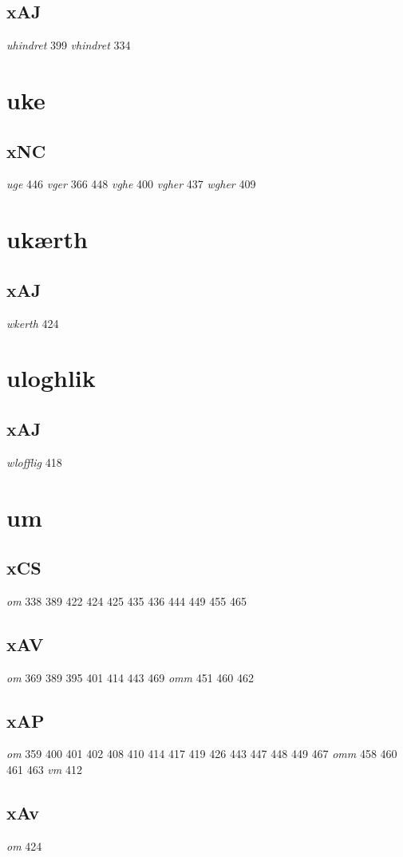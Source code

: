\documentclass[a4paper,twocolumn]{article}
\begin{document}
\subsection{xAJ}
\label{sec:org66fe8f0}
\emph{uhindret} 399 \emph{vhindret} 334 
\section{uke}
\label{sec:org7953daa}
\subsection{xNC}
\label{sec:org8186ee0}
\emph{uge} 446 \emph{vger} 366 448 \emph{vghe} 400 \emph{vgher} 437 \emph{wgher} 409 
\section{ukærth}
\label{sec:org2df0157}
\subsection{xAJ}
\label{sec:orgf1f5e4e}
\emph{wkerth} 424 
\section{uloghlik}
\label{sec:org53bb2c6}
\subsection{xAJ}
\label{sec:orgf93acec}
\emph{wlofflig} 418 
\section{um}
\label{sec:orgecf5bac}
\subsection{xCS}
\label{sec:org1674a6e}
\emph{om} 338 389 422 424 425 435 436 444 449 455 465 
\subsection{xAV}
\label{sec:org09f15a0}
\emph{om} 369 389 395 401 414 443 469 \emph{omm} 451 460 462 
\subsection{xAP}
\label{sec:orgf5dd9ff}
\emph{om} 359 400 401 402 408 410 414 417 419 426 443 447 448 449 467 \emph{omm} 458 460 461 463 \emph{vm} 412 
\subsection{xAv}
\label{sec:orgabcfc43}
\emph{om} 424 
\end{document}
